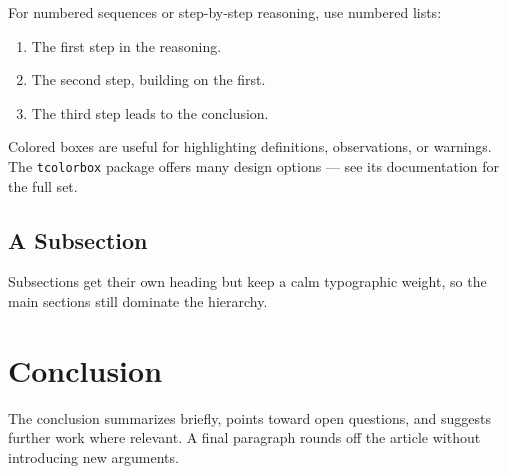 \documentclass[12pt]{article}
\begin{document}
For numbered sequences or step-by-step reasoning, use numbered
lists:
\begin{enumerate}
  \item The first step in the reasoning.
  \item The second step, building on the first.
  \item The third step leads to the conclusion.
\end{enumerate}

\begin{tcolorbox}[colback=Beige, colframe=DarkSlateGray, title=Note]
  Colored boxes are useful for highlighting definitions,
  observations, or warnings. The \texttt{tcolorbox} package
  offers many design options --- see its documentation for
  the full set.
\end{tcolorbox}

\subsection{A Subsection}

Subsections get their own heading but keep a calm typographic
weight, so the main sections still dominate the hierarchy.


\section{Conclusion}

The conclusion summarizes briefly, points toward open questions,
and suggests further work where relevant. A final paragraph rounds
off the article without introducing new arguments.




\end{document}
